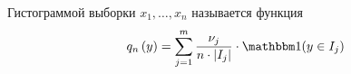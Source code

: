 \begin{comment}
Вспомним формулу \eqref{eq:cdfn_difference}
\begin{align*}
  \cdfn{a_j}&-\cdfn{a_{j-1}}=\\
  &=\frac{1}{n}\cdot \sum_{k=1}^n
  \left[\indicator{x_k\le a_j}-\indicator{x_k\le a_{j-1}}\right]
\end{align*}

Очевидно, что нас интересуют те пары, разность которых не равна нулю.
Это значит, что те случаи, когда $x>a_j$ или $x\le a_{j-1}$, нас не интересуют.
Поскольку такой случай, что $a_j<x\le a_{j-1}$ невозможен, то его тоже отбросим.
Значит, остался только тот вариант,
когда $x$ попадает в полуинтервал $\left(a_{j-1},a_j\right]$
$$\frac{1}{n}\cdot \sum_{k=1}^n
    \left[\indicator{x_k\le a_j}-\indicator{x_k\le a_{j-1}}\right]
  =\frac{1}{n}\cdot \sum_{k=1}^n \indicator{x_k\in \left(a_{j-1},a_j\right]}
$$

Видим знакомые полуинтервалы $\left(a_{j-1},a_j\right]=I_j$. Воспользуемся этим
$$\frac{1}{n}\cdot \sum_{k=1}^n \indicator{x_k\in \left(a_{j-1},a_j\right]}
=\frac{1}{n}\cdot \sum_{k=1}^n \indicator{x_k\in I_j}$$

Получаем компактную запись для разности функций распределения
\begin{equation}\label{eq:cdfn_difference_final}
\cdfn{a_j}-\cdfn{a_{j-1}}
=\frac{1}{n}\cdot \sum_{k=1}^n \indicator{x_k\in I_j}
\end{equation}


Вернёмся к уравнению \eqref{eq:histogram_start}
$$
q_n\left(y\right)
=\sum_{j=1}^m \frac{\cdfn{a_j}-\cdfn{a_{j-1}}}{a_j-a_{j-1}}
  \cdot\indicator{y\in I_j}
  $$

Воспользовавшись тем,
что $\left(a_j-a_{j-1}\right)$ --- длина полуинтервала $I_j$,
а разность $\cdfn{a_j}-\cdfn{a_{j-1}}$ была только что переписана
через индикаторы, получаем такую формулу
\begin{equation}\label{eq:histogramPreFinal}
  q_n\left(y\right)
    =\sum_{j=1}^m\frac{1}{n}\sum_{k=1}^n
      \indicator{x_k\in I_j}\cdot\frac{1}{\left|I_j\right|}
      \cdot \indicator{y \in I_j}
\end{equation}
\end{comment}
\begin{definition}[Гистограмма]
  Гистограммой выборки $x_1, \dots, x_n$ называется функция
  \begin{equation*}
    q_n\left(y\right)
    =\sum_{j=1}^m \frac{\nu_j}{n\cdot\left|I_j\right|}
      \cdot \indicator{y\in I_j}
  \end{equation*}
\end{definition}

